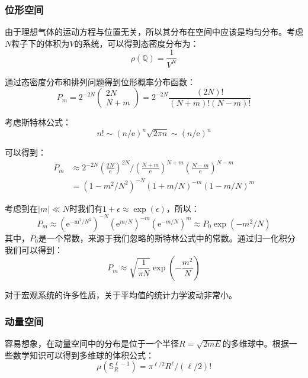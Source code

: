 \documentclass[UTF8]{ctexart}
\newcommand{\secsection}{\subsubsection}
\newcommand{\backdoc}{\normalsize}
\begin{document}
	\secsection{位形空间}
	
	\backdoc
	由于理想气体的运动方程与位置无关，所以其分布在空间中应该是均匀分布。考虑$N$粒子下的体积为$V$的系统，可以得到态密度分布为：
	\begin{equation}
	\rho(\mathbb{Q})=\frac{1}{V^{N}}
	\end{equation}
	
	通过态密度分布和排列问题得到位形概率分布函数：
	\begin{equation}
	P_{m}=2^{-2 N} \left( \begin{array}{c}{2 N} \\ {N+m}\end{array}\right)=2^{-2 N} \frac{(2 N) !}{(N+m) !(N-m) !}
	\end{equation}
	
	考虑斯特林公式：
	\begin{equation}
	n ! \sim(n / \mathrm{e})^{n} \sqrt{2 \pi n} \sim(n / \mathrm{e})^{n}
	\end{equation}
	
	可以得到：
	\begin{equation}
	\begin{aligned}
	P_{m} &\approx 2^{-2 N}\left(\frac{2 N}{\mathrm{e}}\right)^{2 N} /\left(\frac{N+m}{\mathrm{e}}\right)^{N+m}\left(\frac{N-m}{\mathrm{e}}\right)^{N-m}\\
	&=\left(1-m^{2} / N^{2}\right)^{-N}(1+m / N)^{-m}(1-m / N)^{m}
	\end{aligned}
	\end{equation}
	
	\noindent 考虑到在$|m| \ll N$时我们有$1+\epsilon \approx \exp (\epsilon)$，所以：
	\begin{equation}
	P_{m} \approx\left(\mathrm{e}^{-\mathrm{m}^{2} / N^{2}}\right)^{-N}\left(\mathrm{e}^{m / N}\right)^{-m}\left(\mathrm{e}^{-m / N}\right)^{m} \approx P_{0} \exp \left(-m^{2} / N\right)
	\end{equation}
	\noindent 其中，$P_{0}$是一个常数，来源于我们忽略的斯特林公式中的常数。通过归一化积分我们可以得到：
	\begin{equation}
	P_{m} \approx \sqrt{\frac{1}{\pi N}} \exp \left(-\frac{m^{2}}{N}\right)
	\end{equation}
	
	对于宏观系统的许多性质，关于平均值的统计力学波动非常小。
	
	\secsection{动量空间}
	
	\backdoc
	容易想象，在动量空间中的分布是位于一个半径$R=\sqrt{2 m E}$的多维球中。根据一些数学知识可以得到多维球的体积公式：
	\begin{equation}
	\mu\left(\mathbb{S}_{R}^{\ell-1}\right)=\pi^{\ell / 2} R^{\ell} /(\ell / 2) !\label{2.1}
	\end{equation}
	
\end{document}
